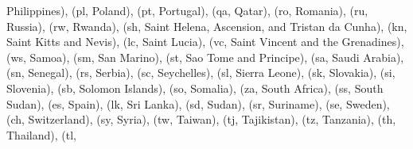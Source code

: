 \documentclass[letterpaper,10pt,english]{sphinxmanual}
\begin{document}
\begin{fulllineitems}
\begin{fulllineitems}
\textquotesingle{}Philippines\textquotesingle{}), (\textquotesingle{}pl\textquotesingle{}, \textquotesingle{}Poland\textquotesingle{}), (\textquotesingle{}pt\textquotesingle{}, \textquotesingle{}Portugal\textquotesingle{}), (\textquotesingle{}qa\textquotesingle{}, \textquotesingle{}Qatar\textquotesingle{}), (\textquotesingle{}ro\textquotesingle{}, \textquotesingle{}Romania\textquotesingle{}), (\textquotesingle{}ru\textquotesingle{}, \textquotesingle{}Russia\textquotesingle{}), (\textquotesingle{}rw\textquotesingle{}, \textquotesingle{}Rwanda\textquotesingle{}), (\textquotesingle{}sh\textquotesingle{}, \textquotesingle{}Saint Helena, Ascension, and Tristan da Cunha\textquotesingle{}), (\textquotesingle{}kn\textquotesingle{}, \textquotesingle{}Saint Kitts and Nevis\textquotesingle{}), (\textquotesingle{}lc\textquotesingle{}, \textquotesingle{}Saint Lucia\textquotesingle{}), (\textquotesingle{}vc\textquotesingle{}, \textquotesingle{}Saint Vincent and the Grenadines\textquotesingle{}), (\textquotesingle{}ws\textquotesingle{}, \textquotesingle{}Samoa\textquotesingle{}), (\textquotesingle{}sm\textquotesingle{}, \textquotesingle{}San Marino\textquotesingle{}), (\textquotesingle{}st\textquotesingle{}, \textquotesingle{}Sao Tome and Principe\textquotesingle{}), (\textquotesingle{}sa\textquotesingle{}, \textquotesingle{}Saudi Arabia\textquotesingle{}), (\textquotesingle{}sn\textquotesingle{}, \textquotesingle{}Senegal\textquotesingle{}), (\textquotesingle{}rs\textquotesingle{}, \textquotesingle{}Serbia\textquotesingle{}), (\textquotesingle{}sc\textquotesingle{}, \textquotesingle{}Seychelles\textquotesingle{}), (\textquotesingle{}sl\textquotesingle{}, \textquotesingle{}Sierra Leone\textquotesingle{}), (\textquotesingle{}sk\textquotesingle{}, \textquotesingle{}Slovakia\textquotesingle{}), (\textquotesingle{}si\textquotesingle{}, \textquotesingle{}Slovenia\textquotesingle{}), (\textquotesingle{}sb\textquotesingle{}, \textquotesingle{}Solomon Islands\textquotesingle{}), (\textquotesingle{}so\textquotesingle{}, \textquotesingle{}Somalia\textquotesingle{}), (\textquotesingle{}za\textquotesingle{}, \textquotesingle{}South Africa\textquotesingle{}), (\textquotesingle{}ss\textquotesingle{}, \textquotesingle{}South Sudan\textquotesingle{}), (\textquotesingle{}es\textquotesingle{}, \textquotesingle{}Spain\textquotesingle{}), (\textquotesingle{}lk\textquotesingle{}, \textquotesingle{}Sri Lanka\textquotesingle{}), (\textquotesingle{}sd\textquotesingle{}, \textquotesingle{}Sudan\textquotesingle{}), (\textquotesingle{}sr\textquotesingle{}, \textquotesingle{}Suriname\textquotesingle{}), (\textquotesingle{}se\textquotesingle{}, \textquotesingle{}Sweden\textquotesingle{}), (\textquotesingle{}ch\textquotesingle{}, \textquotesingle{}Switzerland\textquotesingle{}), (\textquotesingle{}sy\textquotesingle{}, \textquotesingle{}Syria\textquotesingle{}), (\textquotesingle{}tw\textquotesingle{}, \textquotesingle{}Taiwan\textquotesingle{}), (\textquotesingle{}tj\textquotesingle{}, \textquotesingle{}Tajikistan\textquotesingle{}), (\textquotesingle{}tz\textquotesingle{}, \textquotesingle{}Tanzania\textquotesingle{}), (\textquotesingle{}th\textquotesingle{}, \textquotesingle{}Thailand\textquotesingle{}), (\textquotesingle{}tl\textquotesingle{}, 
\end{fulllineitems}
\end{fulllineitems}
\end{document}
